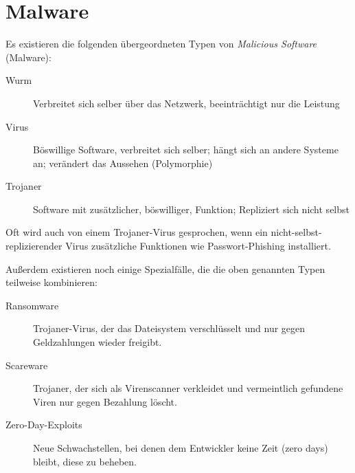     \section{Malware}
        Es existieren die folgenden übergeordneten Typen von \textit{Malicious Software} (Malware):
        \begin{description}
        	\item[Wurm] Verbreitet sich selber über das Netzwerk, beeinträchtigt nur die Leistung
        	\item[Virus] Böswillige Software, verbreitet sich selber; hängt sich an andere Systeme an; verändert das Aussehen (Polymorphie)
        	\item[Trojaner] Software mit zusätzlicher, böswilliger, Funktion; Repliziert sich nicht selbst
        \end{description}
        Oft wird auch von einem Trojaner-Virus gesprochen, wenn ein nicht-selbst-replizierender Virus zusätzliche Funktionen wie Passwort-Phishing installiert.
        
        Außerdem existieren noch einige Spezialfälle, die die oben genannten Typen teilweise kombinieren:
        \begin{description}
        	\item[Ransomware] Trojaner-Virus, der das Dateisystem verschlüsselt und nur gegen Geldzahlungen wieder freigibt.
        	\item[Scareware] Trojaner, der sich als Virenscanner verkleidet und vermeintlich gefundene Viren nur gegen Bezahlung löscht.
        	\item[Zero-Day-Exploits] Neue Schwachstellen, bei denen dem Entwickler keine Zeit (zero days) bleibt, diese zu beheben.
        \end{description}

